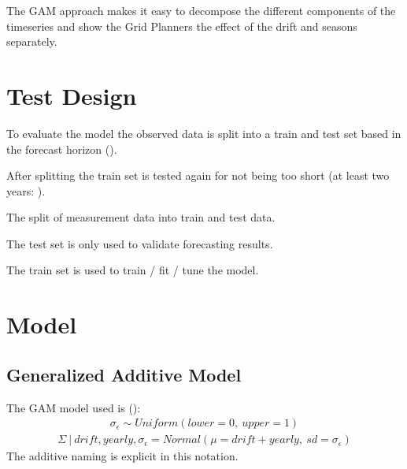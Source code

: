 \documentclass[letterpaper,10pt,english]{sphinxmanual}
\let\sphinxpxdimen\pdfpxdimen\else\newdimen\sphinxpxdimen
\begin{document}
The GAM approach makes it easy to decompose the different components of the timeseries and show the Grid Planners the effect of the drift and seasons separately.


\section{Test Design}
\label{\detokenize{modeling:test-design}}
To evaluate the model the observed data is split into a train and test set based in the forecast horizon ({\hyperref[\detokenize{autoapi/src/preprocess/preprocess/index:src.preprocess.preprocess.split_last}]{}}).

After splitting the train set is tested again for not being too short (at least two years: {\hyperref[\detokenize{autoapi/src/preprocess/preprocess/index:src.preprocess.preprocess.too_short}]{}}).
\begin{quote}

\noindent{\hspace*{\fill}\sphinxincludegraphics[width=600\sphinxpxdimen]{{train_test}.png}\hspace*{\fill}}
\end{quote}

The split of measurement data into train and test data.

The test set is only used to validate forecasting results.

The train set is used to train / fit / tune the model.


\section{Model}
\label{\detokenize{modeling:model}}

\subsection{Generalized Additive Model}
\label{\detokenize{modeling:generalized-additive-model}}
The GAM model used is ({\hyperref[\detokenize{autoapi/src/model/model/index:src.model.model.create_model}]{}}):
\begin{equation*}
\begin{split}\sigma_\epsilon \sim Uniform(lower=0, \:upper=1)\end{split}
\end{equation*}\begin{equation*}
\begin{split}\Sigma\:|\:drift, yearly, \sigma_\epsilon = Normal(\mu=drift + yearly, \:sd=\sigma_\epsilon)\end{split}
\end{equation*}
The additive naming is explicit in this notation.
\end{document}
